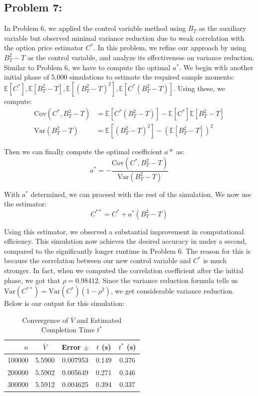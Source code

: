 \documentclass{report}
\begin{document}
\newpage


\subsection*{Problem 7:}
In Problem 6, we applied the control variable method using $B_T$ as the auxiliary variable but observed minimal variance reduction due to weak correlation with the option price estimator $C^*$. In this problem, we refine our approach by using $B_T^2 - T$ as the control variable, and analyze its effectiveness on variance reduction. \\

Similar to Problem 6, we have to compute the optimal $a^*$. We begin with another initial phase of 5,000 simulations to estimate the required sample moments: $\mathbb{E}[C^*], \mathbb{E}[B^2_T-T], \mathbb{E}[(B^2_T-T)^2], \mathbb{E}[C^*(B^2_T-T)]$. Using these, we compute:
\begin{align*}
\text{Cov}(C^*, B^2_T-T) &= \mathbb{E}[C^*(B^2_T-T)] - \mathbb{E}[C^*]\mathbb{E}[B^2_T-T] \\
\text{Var}(B^2_T-T) &=\mathbb{E}[(B^2_T-T)^2] - (\mathbb{E}[B^2_T-T])^2
\end{align*}

Then we can finally compute the optimal coefficient $a*$ as:
\[
a^* = -\frac{\text{Cov}(C^*, B^2_T-T)}{\text{Var}(B^2_T-T)}
\]

With $a^*$ determined, we can proceed with the rest of the simulation. We now use the estimator:
\[
C^{**} = C^* + a^*(B^2_T-T)
\]

Using this estimator, we observed a substantial improvement in computational efficiency. This simulation now achieves the desired accuracy in under a second, compared to the significantly longer runtime in Problem 6. The reason for this is because the correlation between our new control variable and $C^*$ is much stronger. In fact, when we computed the correlation coefficient after the initial phase, we got that $\rho = 0.98412$. Since the variance reduction formula tells us $\text{Var}(C^{**})=\text{Var}(C^*)(1-\rho^2)$, we get considerable variance reduction. \\

Below is our output for this simulation:
\begin{table}[H]
    \centering
    \caption{Convergence of $\overline{V}$ and Estimated Completion Time $t^*$}
    \label{tab:simulation_results}
    \begin{tabular}{rcccc}
        \hline
        $n$ & $\overline{V}$ & Error $\pm$ & $t$ (s) & $t^*$ (s) \\
        \hline
        100000 & 5.5900 & 0.007953 & 0.149 & 0.376 \\
        200000 & 5.5902 & 0.005649 & 0.271 & 0.346 \\
        300000 & 5.5912 & 0.004625 & 0.394 & 0.337 \\
        \hline
    \end{tabular}
\end{table}
\end{document}
